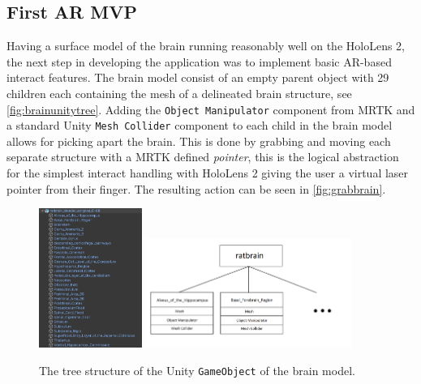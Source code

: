 \subsection*{First AR MVP}
Having a surface model of the brain running reasonably well on the HoloLens 2, the next step in developing the application was to implement basic AR-based interact features. The brain model consist of an empty parent object with 29 children each containing the mesh of a delineated brain structure, see \autoref{fig:brainunitytree}. Adding the \texttt{Object Manipulator} component from MRTK and a standard Unity \texttt{Mesh Collider} component to each child in the brain model allows for picking apart the brain. This is done by grabbing and moving each separate structure with a MRTK defined \textit{pointer}, this is the logical abstraction for the simplest interact handling with HoloLens 2 giving the user a virtual laser pointer from their finger. The resulting action can be seen in \autoref{fig:grabbrain}. 


\begin{figure}[ht]
    \centering
    \includegraphics[width=0.30\textwidth]{fig/brainunitytree.png}
    \includegraphics[width=0.60\textwidth]{fig/shittyassbraintreediagram.png}
    \caption{The tree structure of the Unity \texttt{GameObject} of the brain model.}
    \label{fig:brainunitytree}
\end{figure}

